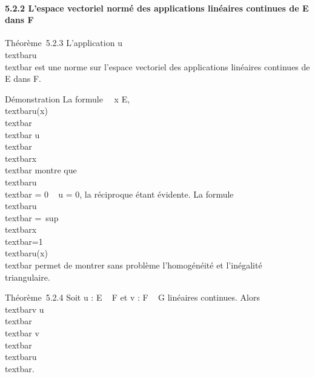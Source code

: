 \paragraph{5.2.2 L'espace vectoriel normé des applications linéaires
continues de E dans F}

Théorème~5.2.3 L'application
u\mapsto~\\textbar{}u\\textbar{}
est une norme sur l'espace vectoriel des applications linéaires
continues de E dans F.

Démonstration La formule \forall~~x \in E,
\\textbar{}u(x)\\textbar{}
\leq\\textbar{}
u\\textbar{}\,\\textbar{}x\\textbar{}
montre que \\textbar{}u\\textbar{} = 0 \rigtharrow~ u
= 0, la réciproque étant évidente. La formule
\\textbar{}u\\textbar{}
=\
sup\\textbar{}x\\textbar{}=1\\textbar{}u(x)\\textbar{}
permet de montrer sans problème l'homogénéité et l'inégalité
triangulaire.

Théorème~5.2.4 Soit u : E \rightarrow~ F et v : F \rightarrow~ G linéaires continues. Alors
\\textbar{}v \cdot u\\textbar{}
\leq\\textbar{}
v\\textbar{}\,\\textbar{}u\\textbar{}.

